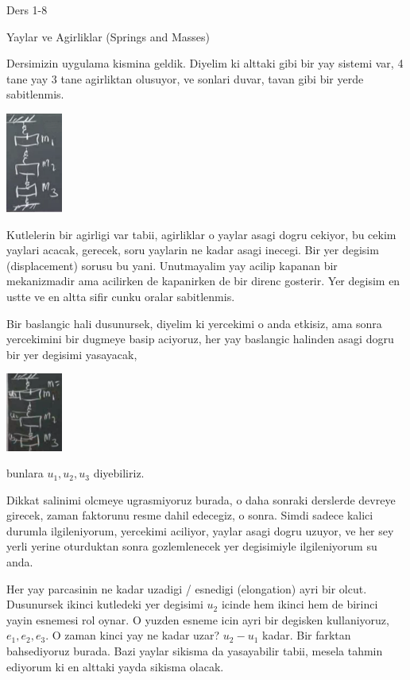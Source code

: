 \documentclass[12pt,fleqn]{article}\usepackage{../../common}
\begin{document}
Ders 1-8

Yaylar ve Agirliklar (Springs and Masses)

Dersimizin uygulama kismina geldik. Diyelim ki alttaki gibi bir yay sistemi var,
4 tane yay 3 tane agirliktan olusuyor, ve sonlari duvar, tavan gibi bir yerde
sabitlenmis.

\includegraphics[width=5em]{compscieng_1_08_01.png}

Kutlelerin bir agirligi var tabii, agirliklar o yaylar asagi dogru cekiyor, bu
cekim yaylari acacak, gerecek, soru yaylarin ne kadar asagi inecegi.  Bir yer
degisim (displacement) sorusu bu yani. Unutmayalim yay acilip kapanan bir
mekanizmadir ama acilirken de kapanirken de bir direnc gosterir. Yer degisim en
ustte ve en altta sifir cunku oralar sabitlenmis.

Bir baslangic hali dusunursek, diyelim ki yercekimi o anda etkisiz, ama sonra
yercekimini bir dugmeye basip aciyoruz, her yay baslangic halinden asagi
dogru bir yer degisimi yasayacak, 

\includegraphics[width=5em]{compscieng_1_08_02.png}

bunlara $u_1,u_2,u_3$ diyebiliriz.

Dikkat salinimi olcmeye ugrasmiyoruz burada, o daha sonraki derslerde devreye
girecek, zaman faktorunu resme dahil edecegiz, o sonra. Simdi sadece kalici
durumla ilgileniyorum, yercekimi aciliyor, yaylar asagi dogru uzuyor, ve her sey
yerli yerine oturduktan sonra gozlemlenecek yer degisimiyle ilgileniyorum su
anda.

Her yay parcasinin ne kadar uzadigi / esnedigi (elongation) ayri bir olcut.
Dusunursek ikinci kutledeki yer degisimi $u_2$ icinde hem ikinci hem de birinci
yayin esnemesi rol oynar. O yuzden esneme icin ayri bir degisken kullaniyoruz,
$e_1,e_2,e_3$. O zaman kinci yay ne kadar uzar? $u_2-u_1$ kadar. Bir farktan
bahsediyoruz burada. Bazi yaylar sikisma da yasayabilir tabii, mesela tahmin
ediyorum ki en alttaki yayda sikisma olacak.
\end{document}

